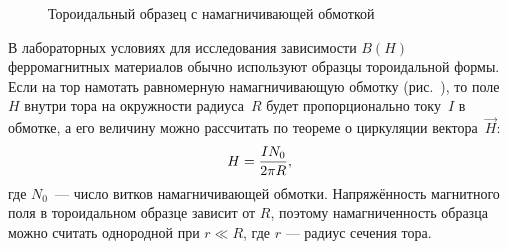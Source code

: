 

\label{sec:toroid-measure}

\begin{wrapfigure}{o}{0.35\textwidth}
    \centering
    \caption{Тороидальный образец с намагничивающей обмоткой}
\end{wrapfigure}

В лабораторных условиях для исследования зависимости $B(H)$ ферромагнитных
материалов обычно используют образцы тороидальной формы. Если на тор намотать
равномерную намагничивающую обмотку (рис.~), то поле~$H$ внутри
тора на окружности радиуса~$R$ будет пропорционально току~$I$ в обмотке, а его
величину можно рассчитать по теореме о циркуляции вектора~$\vec{H}$:
\begin{equation}
    \eqmark{H-toroid}
    H = \frac{IN_0}{2\pi R},
\end{equation}
где $N_0$~--- число витков намагничивающей обмотки. Напряжённость магнитного
поля в тороидальном образце зависит от $R$, поэтому
намагниченность образца можно считать однородной при $r \ll R$, где $r$ ---
радиус сечения тора.


